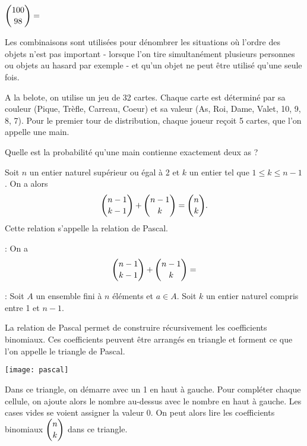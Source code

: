 \documentclass[11pt,fleqn, openany]{book} %
\begin{document}
\begin{example} $\dbinom{100}{98}=$\end{example}



\begin{proposition}Les combinaisons sont utilisées pour dénombrer les situations où l'ordre des objets n'est pas important - lorsque l'on tire simultanément plusieurs personnes ou objets au hasard par exemple - et qu'un objet ne peut être utilisé qu'une seule fois.\end{proposition}

\begin{example} A la belote, on utilise un jeu de 32 cartes. Chaque carte est déterminé par sa couleur (Pique, Trèfle, Carreau, Coeur) et sa valeur (As, Roi, Dame, Valet, 10, 9, 8, 7). Pour le premier tour de distribution, chaque joueur reçoit 5 cartes, que l'on appelle une main. 

Quelle est la probabilité qu'une main contienne exactement deux as ?


\vskip200pt
\end{example}



\begin{proposition}Soit $n$ un entier naturel supérieur ou égal à 2 et $k$ un entier tel que $1\leqslant k\leqslant n-1$. On a alors
\[ \dbinom{n-1}{k-1}+\dbinom{n-1}{k} = \dbinom{n}{k}.\]
Cette relation s'appelle la relation de Pascal.\end{proposition}

\begin{demonstration} : On a
\[ \dbinom{n-1}{k-1}+\dbinom{n-1}{k}=\]

\vfill \end{demonstration}
\newpage

\begin{demonstration}[Combinatoire] : Soit $A$ un ensemble fini à $n$ éléments et $a\in A$. Soit $k$ un entier naturel compris entre 1 et $n-1$. 

\vskip350pt
\end{demonstration}


\begin{proposition}La relation de Pascal permet de construire récursivement les coefficients binomiaux. Ces coefficients peuvent être arrangés en triangle et forment ce que l'on appelle le triangle de Pascal.
\vskip5pt
\begin{minipage}{0.45\linewidth}
\begin{center}
\texttt{[image: pascal]}
\end{center}
\end{minipage}\hfill\begin{minipage}{0.5\linewidth}
Dans ce triangle, on démarre avec un 1 en haut à gauche. Pour compléter chaque cellule, on ajoute alors le nombre au-dessus avec le nombre en haut à gauche. Les cases vides se voient assigner la valeur 0. On peut alors lire les coefficients binomiaux $\dbinom{n}{k}$ dans ce triangle.
\end{minipage}




\end{proposition}
\end{document}
